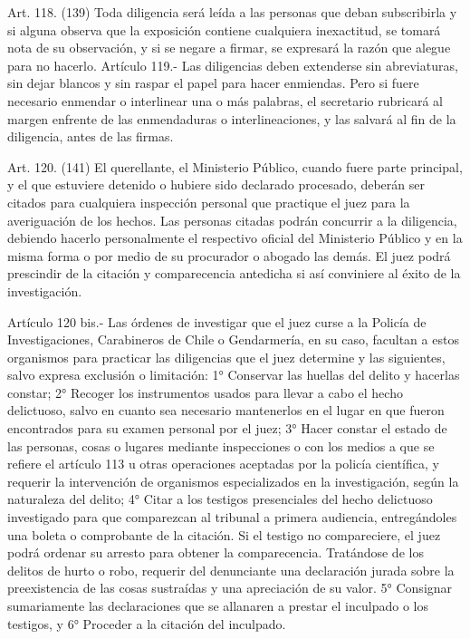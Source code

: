     Art. 118. (139) Toda diligencia será leída a las personas que deban subscribirla y si alguna observa que la exposición contiene cualquiera inexactitud, se tomará nota de su observación, y si se negare a firmar, se expresará la razón que alegue para no hacerlo.
    Artículo 119.- Las diligencias deben extenderse sin abreviaturas, sin dejar blancos y sin raspar el papel para hacer enmiendas. Pero si fuere necesario enmendar o interlinear una o más palabras, el secretario rubricará al margen enfrente de las enmendaduras o interlineaciones, y las salvará al fin de la diligencia, antes de las firmas.

    Art. 120. (141) El querellante, el Ministerio Público, cuando fuere parte principal, y el que estuviere detenido o hubiere sido declarado procesado, deberán ser citados para cualquiera inspección personal que practique el juez para la averiguación de los hechos.
    Las personas citadas podrán concurrir a la diligencia, debiendo hacerlo personalmente el respectivo oficial del Ministerio Público y en la misma forma o por medio de su procurador o abogado las demás.
    El juez podrá prescindir de la citación y comparecencia antedicha si así conviniere al éxito de la investigación.



    Artículo 120 bis.- Las órdenes de investigar que el juez curse a la Policía de Investigaciones, Carabineros de Chile o Gendarmería, en su caso, facultan a estos organismos para practicar las diligencias que el juez determine y las siguientes, salvo expresa exclusión o limitación:
    1° Conservar las huellas del delito y hacerlas constar;
  2° Recoger los instrumentos usados para llevar a cabo el hecho delictuoso, salvo en cuanto sea necesario mantenerlos en el lugar en que fueron encontrados para su examen personal por el juez;
    3° Hacer constar el estado de las personas, cosas o lugares mediante inspecciones o con los medios a que se refiere el artículo 113 u otras operaciones aceptadas por la policía científica, y requerir la intervención de organismos especializados en la investigación, según la naturaleza del delito;
    4° Citar a los testigos presenciales del hecho delictuoso investigado para que comparezcan al tribunal a primera audiencia, entregándoles una boleta o comprobante de la citación.  Si el testigo no compareciere, el juez podrá ordenar su arresto para obtener la comparecencia.
    Tratándose de los delitos de hurto o robo, requerir del denunciante una declaración jurada sobre la preexistencia de las cosas sustraídas y una apreciación de su valor.
    5° Consignar sumariamente las declaraciones que se allanaren a prestar el inculpado o los testigos, y
    6° Proceder a la citación del inculpado.

